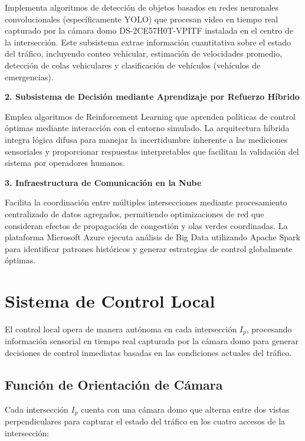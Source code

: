 \documentclass[12pt,a4paper,oneside]{report}
\begin{document}
Implementa algoritmos de detección de objetos basados en redes neuronales convolucionales (específicamente YOLO) que procesan video en tiempo real capturado por la cámara domo DS-2CE57H0T-VPITF instalada en el centro de la intersección. Este subsistema extrae información cuantitativa sobre el estado del tráfico, incluyendo conteo vehicular, estimación de velocidades promedio, detección de colas vehiculares y clasificación de vehículos (vehículos de emergencias).

\textbf{2. Subsistema de Decisión mediante Aprendizaje por Refuerzo Híbrido}

Emplea algoritmos de Reinforcement Learning que aprenden políticas de control óptimas mediante interacción con el entorno simulado. La arquitectura híbrida integra lógica difusa para manejar la incertidumbre inherente a las mediciones sensoriales y proporcionar respuestas interpretables que facilitan la validación del sistema por operadores humanos.

\textbf{3. Infraestructura de Comunicación en la Nube}

Facilita la coordinación entre múltiples intersecciones mediante procesamiento centralizado de datos agregados, permitiendo optimizaciones de red que consideran efectos de propagación de congestión y olas verdes coordinadas. La plataforma Microsoft Azure ejecuta análisis de Big Data utilizando Apache Spark para identificar patrones históricos y generar estrategias de control globalmente óptimas.

\section{Sistema de Control Local}\label{sistema-de-control-local}

El control local opera de manera autónoma en cada intersección \(I_{p}\), procesando información sensorial en tiempo real capturada por la cámara domo para generar decisiones de control inmediatas basadas en las condiciones actuales del tráfico.

\subsection{Función de Orientación de Cámara}\label{funciuxf3n-de-orientaciuxf3n-de-cuxe1mara}

Cada intersección \(I_{p}\) cuenta con una cámara domo que alterna entre dos vistas perpendiculares para capturar el estado del tráfico en los cuatro accesos de la intersección:
\end{document}
